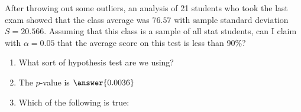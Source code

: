 \documentclass{ximera}
\begin{document}
\begin{problem}
After throwing out some outliers, an analysis of 21 students who took the last exam showed that the class average was $76.57$ with sample standard deviation $S=20.566$.  Assuming that this class is a sample of all stat students, can I claim with $\alpha=0.05$ that the average score on this test is less than 90\%?

\begin{enumerate}
\item What sort of hypothesis test are we using?

\begin{multipleChoice}
\end{multipleChoice}

\item  The $p$-value is $\answer{0.0036}$

\item Which of the following is true:
\begin{multipleChoice}
\end{multipleChoice}

\end{enumerate}



\end{problem}
\end{document}
